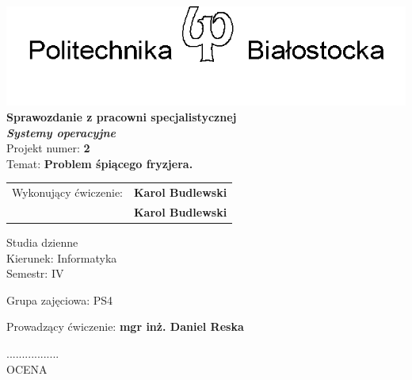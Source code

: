 \documentclass[12pt,a4paper]{article}
\newcommand{\numerzajec}{2}
\newcommand{\tematzajec}{Problem śpiącego fryzjera.}
\begin{document}
	\thispagestyle{empty}
	\begin{center}
		\vspace*{1.6cm}
		\includegraphics[width=0.55\linewidth]{pblogo.png}	\\
		\vspace{0.5cm}
		\large
		\textsf{\textbf{Sprawozdanie z pracowni specjalistycznej}} \\
		\vspace{0.5cm}
		\textsf{\textbf{\textit{Systemy operacyjne}}}	\\
		\vspace{1cm}
		\textsf{Projekt numer: \textbf{\numerzajec}}	\\
		\vspace{0.5cm}
		\textsf{Temat: \textbf{\tematzajec}}
	\end{center}

	\vspace{2cm}
	\begin{tabular}{rl}
        Wykonujący ćwiczenie: &\textbf{Karol Budlewski} \\
                              & \textbf{Karol Budlewski} \\
	\end{tabular}

	\vspace{3.5cm}	

	\begin{minipage}{0.45\linewidth}
		\large
		\begin{spacing}{1.5}
		Studia dzienne \\
		Kierunek: Informatyka \\
		Semestr: IV \\
		\end{spacing}
	\end{minipage}
	\begin{minipage}[t]{0.5\linewidth}
		\large
		\begin{spacing}{1.2}
		Grupa zajęciowa: PS4
		\end{spacing}
	\end{minipage}
	
	Prowadzący ćwiczenie: \textbf{mgr inż. Daniel Reska} \\
	
	\begin{flushright}
		\begin{minipage}[t]{0.3\linewidth}
			\centering
			................. \\
			\small OCENA
		\end{minipage}
	\end{flushright}
	
\end{document}
